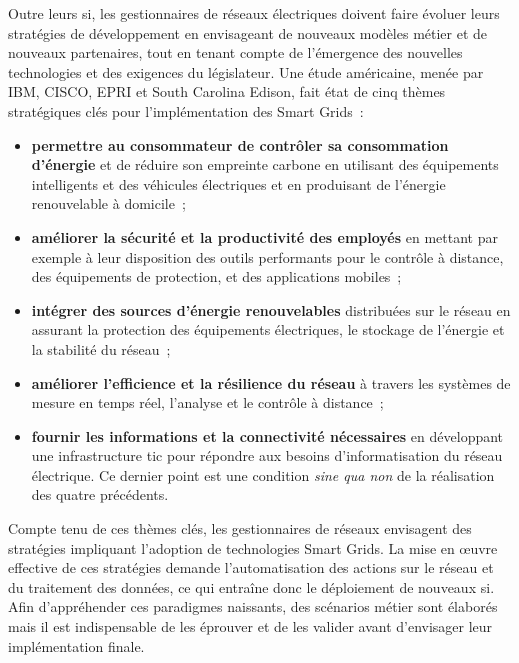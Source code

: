 Outre leurs \gls{si}, les gestionnaires de réseaux électriques doivent faire 
évoluer 
leurs stratégies de développement en envisageant de nouveaux modèles métier et 
de nouveaux partenaires, tout en tenant compte de l'émergence des nouvelles 
technologies et des exigences du législateur. Une étude américaine, menée par 
IBM, CISCO, EPRI et South Carolina Edison, fait état de cinq thèmes stratégiques 
clés pour l'implémentation des Smart Grids~:

\begin{itemize}

    \item \textbf{permettre au consommateur de contrôler sa consommation 
    d'énergie} et de réduire son empreinte carbone en utilisant des équipements 
    intelligents et des véhicules électriques et en produisant de l'énergie 
    renouvelable à domicile~;

    \item \textbf{améliorer la sécurité et la productivité des employés} en 
    mettant par exemple à leur disposition des outils performants pour le 
    contrôle à distance, des équipements de protection, et des applications 
    mobiles~; 

    \item \textbf{intégrer des sources d'énergie renouvelables} distribuées sur 
    le réseau en assurant la protection des équipements électriques, le 
    stockage de l'énergie et la stabilité du réseau~; 

    \item \textbf{améliorer l'efficience et la résilience du réseau} à travers 
    les systèmes de mesure en temps réel, l'analyse et le contrôle à distance~;

    \item \textbf{fournir les informations et la connectivité nécessaires} en
    développant une infrastructure \gls{tic} pour répondre aux besoins 
    d'informatisation du réseau électrique. Ce dernier point est une condition 
    \textit{sine qua non} de la réalisation des quatre précédents.
\end{itemize}

Compte tenu de ces thèmes clés, les gestionnaires de réseaux envisagent des 
stratégies impliquant l'adoption de technologies Smart Grids. 
La mise en œuvre effective de ces stratégies demande l'automatisation des 
actions sur le réseau et du traitement des données, ce qui entraîne donc le 
déploiement de nouveaux \gls{si}. Afin d'appréhender ces paradigmes naissants, 
des 
scénarios métier sont élaborés mais il est indispensable de les éprouver et de 
les valider avant d'envisager leur implémentation finale.

